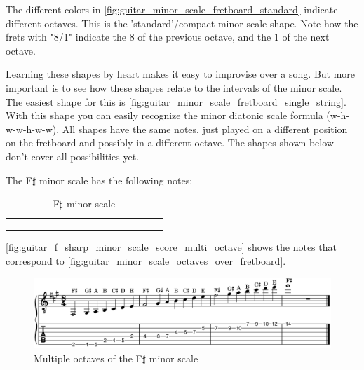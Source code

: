 The different colors in \autoref{fig:guitar_minor_scale_fretboard_standard} indicate different octaves. This is the 'standard'/compact minor scale shape. Note how the frets with "8/1" indicate the 8 of the previous octave, and the 1 of the next octave.

Learning these shapes by heart makes it easy to improvise over a song. But more important is to see how these shapes relate to the intervals of the minor scale. The easiest shape for this is \autoref{fig:guitar_minor_scale_fretboard_single_string}. With this shape you can easily recognize the minor diatonic scale formula (w-h-w-w-h-w-w). All shapes have the same notes, just played on a different position on the fretboard and possibly in a different octave. The shapes shown below don't cover all possibilities yet.

The F$\sharp$ minor scale has the following notes:

\begin{table}[h]
	\centering
	\begin{NiceTabular}{*{16}{P{0.05mm}}}
		\Block{}{} &  & &  & &  & &  & &  & &  & &  & & \Block{}{} \\
		 & &  & &  & &  & &  & &  & &  & &  & \\
		 & &  & &  & &  & &  & &  & &  & &  & 
	\end{NiceTabular}
	\caption{F$\sharp$ minor scale}
	\label{tab:guitar_f_sharp_minor_scale}
\end{table}

\autoref{fig:guitar_f_sharp_minor_scale_score_multi_octave} shows the notes that correspond to \autoref{fig:guitar_minor_scale_octaves_over_fretboard}.

\begin{figure}[h]
	\centering
	\includegraphics[width=\textwidth]{../../MuseScore/Guitar/GuitarFSharpMinorMultiOctave.png}
	\caption{Multiple octaves of the F$\sharp$ minor scale}
	\label{fig:guitar_f_sharp_minor_scale_score_multi_octave}
\end{figure}


